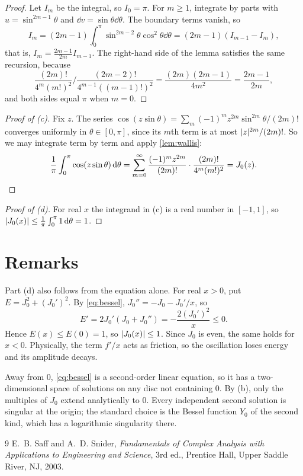 \documentclass[11pt,a4paper]{article}
\begin{document}
\begin{proof}
  Let $I_m$ be the integral, so $I_0 = \pi$. For $m \geq 1$, integrate by parts with
  $u = \sin^{2m-1}\theta$ and $\dd v = \sin\theta \dd\theta$. The boundary terms
  vanish, so
  \[
    I_m = (2m - 1) \int_0^\pi \sin^{2m-2}\theta \cos^2\theta \dd\theta
        = (2m - 1)(I_{m-1} - I_m),
  \]
  that is, $I_m = \frac{2m-1}{2m} I_{m-1}$. The right-hand side of the lemma
  satisfies the same recursion, because
  \[
    \frac{(2m)!}{4^m (m!)^2} \bigg/ \frac{(2m-2)!}{4^{m-1} ((m-1)!)^2}
    = \frac{(2m)(2m-1)}{4m^2} = \frac{2m-1}{2m},
  \]
  and both sides equal $\pi$ when $m = 0$.
\end{proof}

\begin{proof}[Proof of (c)]
  Fix $z$. The series $\cos(z\sin\theta) = \sum_m (-1)^m z^{2m} \sin^{2m}\theta / (2m)!$
  converges uniformly in $\theta \in [0, \pi]$, since its $m$th term is at most
  $\lvert z\rvert^{2m} / (2m)!$. So we may integrate term by term and apply \cref{lem:wallis}:
  \[
    \frac1\pi \int_0^\pi \cos(z \sin\theta) \mathop{}\!\mathrm{d}\theta
    = \sum_{m=0}^{\infty} \frac{(-1)^m z^{2m}}{(2m)!} \cdot \frac{(2m)!}{4^m (m!)^2}
    = J_0(z). \qedhere
  \]
\end{proof}

\begin{proof}[Proof of (d)]
  For real $x$ the integrand in (c) is a real number in $[-1, 1]$, so
  $\lvert J_0(x)\rvert \leq \frac1\pi \int_0^\pi 1 \mathop{}\!\mathrm{d}\theta = 1$.
\end{proof}

\section{Remarks}

\begin{remark}
  Part (d) also follows from the equation alone. For real $x > 0$, put
  $E = J_0^2 + (J_0')^2$. By \eqref{eq:bessel},
  $J_0'' = -J_0 - J_0'/x$, so
  \[
    E' = 2 J_0' (J_0 + J_0'') = -\frac{2 (J_0')^2}{x} \leq 0 .
  \]
  Hence $E(x) \leq E(0) = 1$, so $\lvert J_0(x)\rvert \leq 1$. Since $J_0$ is even, the same
  holds for $x < 0$. Physically, the term $f'/x$ acts as friction, so the
  oscillation loses energy and its amplitude decays.
\end{remark}

\begin{remark}
  Away from $0$, \eqref{eq:bessel} is a second-order linear equation, so it has a
  two-dimensional space of solutions on any disc not containing $0$. By (b), only the
  multiples of $J_0$ extend analytically to $0$. Every independent second solution is
  singular at the origin; the standard choice is the Bessel function $Y_0$ of the
  second kind, which has a logarithmic singularity there.
\end{remark}

\begin{thebibliography}{9}
   E.~B. Saff and A.~D. Snider,
    \emph{Fundamentals of Complex Analysis with Applications to Engineering
    and Science}, 3rd ed., Prentice Hall, Upper Saddle River, NJ, 2003.
\end{thebibliography}
\end{document}
